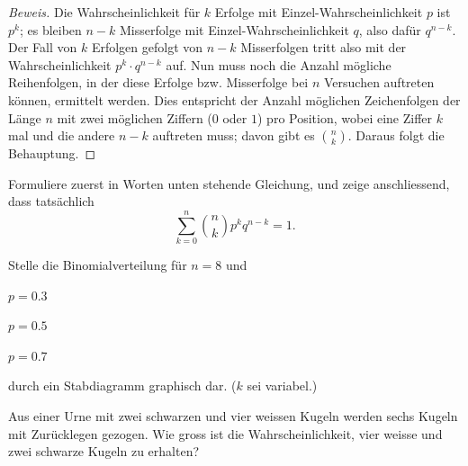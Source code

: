 \documentclass[%
11pt,%
twoside,%
titlepage,%
german,%
headsepline%
]{scrartcl}
\begin{document}
\begin{proof}[Beweis]
Die Wahrscheinlichkeit für $k$ Erfolge mit Einzel-Wahrscheinlichkeit $p$ ist $p^k$; es bleiben $n-k$ Misserfolge mit Einzel-Wahrscheinlichkeit $q$, also dafür $q^{n-k}$. Der Fall von $k$ Erfolgen gefolgt von $n-k$ Misserfolgen tritt also mit der Wahrscheinlichkeit $p^k\cdot q^{n-k}$ auf.  Nun muss noch die Anzahl mögliche Reihenfolgen, in der diese Erfolge bzw. Misserfolge bei $n$ Versuchen auftreten können, ermittelt werden. Dies entspricht der Anzahl möglichen Zeichenfolgen der Länge $n$ mit zwei möglichen Ziffern ($0$ oder $1$) pro Position, wobei eine Ziffer $k$ mal und die andere $n-k$ auftreten muss; davon gibt es $\binom{n}{k}$. Daraus folgt die Behauptung.
\end{proof}

\begin{ueb}
Formuliere zuerst in Worten unten stehende Gleichung, und zeige anschliessend, dass tatsächlich
$$\sum_{k=0}^n\binom{n}{k}p^kq^{n-k}=1.$$
\end{ueb}

\begin{ueb}
Stelle die Binomialverteilung für $n=8$ und

\begin{minipage}{2.5cm}
\begin{enumeratea}
\item $p=0.3$
\end{enumeratea}
\end{minipage}
\begin{minipage}{2.5cm}
\begin{enumeratea}
\addtocounter{enumi}{1}
\item $p=0.5$
\end{enumeratea}
\end{minipage}
\begin{minipage}{2.5cm}
\begin{enumeratea}
\addtocounter{enumi}{2}
\item $p=0.7$
\end{enumeratea}
\end{minipage}

\vspace*{1ex}
durch ein Stabdiagramm graphisch dar. ($k$ sei variabel.)
\end{ueb}

\begin{ueb}
Aus einer Urne mit zwei schwarzen und vier weissen Kugeln werden sechs Kugeln mit Zurücklegen gezogen. Wie gross ist die Wahrscheinlichkeit, vier weisse und zwei schwarze Kugeln zu erhalten?
\end{ueb}
\end{document}
